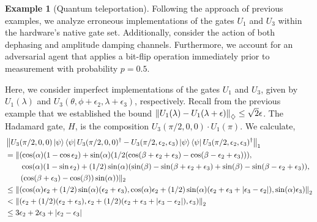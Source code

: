 \documentclass[10pt,a4paper]{amsart}
\theoremstyle{definition}
\theoremstyle{definition}
\newtheorem{example}[definition]{Example}
\theoremstyle{definition}
\theoremstyle{definition}
\theoremstyle{definition}
\theoremstyle{definition}
\begin{document}
  \begin{example}[Quantum teleportation]
    


    Following the approach of previous examples, we analyze erroneous implementations of the gates $U_1$ and $U_3$ within the hardware’s native gate set. Additionally, consider the action of both dephasing and amplitude damping channels. Furthermore, we account for an adversarial agent that applies a bit-flip operation immediately prior to measurement with probability $ p = 0.5 $.  

    Here, we consider imperfect implementations of the gates $U_1$ and $U_3$, given by $ U_1(\lambda) $ and $ U_3(\theta, \phi + \epsilon_2, \lambda + \epsilon_3)$, respectively. 
    Recall from the previous example that we established the bound $\left\lVert U_1(\lambda)- U_1(\lambda + \epsilon)  \right\rVert_{\diamondsuit} \leq \sqrt{2} \epsilon$.
     The Hadamard gate, $H$, is the composition $U_3(\pi/2, 0, 0)\cdot U_1(\pi)$. We calculate,
    \begin{align*}
      &\left\lVert U_3(\pi/2, 0, 0) \ket{\psi}\bra{\psi}U_3(\pi/2, 0, 0)^\dag - U_3(\pi/2, \epsilon_2, \epsilon_3)  \ket{\psi}\bra{\psi}U_3(\pi/2, \epsilon_2, \epsilon_3)^\dag \right\rVert_{1} \\
      & = \lVert (\cos(\alpha)( 1-\cos{\epsilon_2}) + \sin(\alpha)( 1/2(\cos(\beta + \epsilon_2 + \epsilon_3)-\cos(\beta - \epsilon_2 + \epsilon_3))), \\
      & \hspace{20pt} \cos(\alpha)( 1-\sin{\epsilon_2}) + (1/2)\sin(\alpha) (\sin(\beta)-\sin(\beta+\epsilon_2 + \epsilon_3) + \sin(\beta)-\sin(\beta-\epsilon_2 + \epsilon_3)),   \\
      & \hspace{20pt} (\cos(\beta + \epsilon_3)-\cos(\beta))\sin(\alpha) ) \lVert_2 \\
      & \leq \left\lVert (\cos(\alpha) \epsilon_2 + (1/2)\sin(\alpha) (\epsilon_2 + \epsilon_3) ,\cos(\alpha) \epsilon_2 + (1/2)  \sin(\alpha) (\epsilon_2 + \epsilon_3 + |\epsilon_3-\epsilon_2|), \sin(\alpha) \epsilon_3) \right\rVert_{2} \\
      &  < \left\lVert (\epsilon_2 + (1/2)(\epsilon_2 + \epsilon_3), \epsilon_2 + (1/2)   (\epsilon_2 + \epsilon_3 + |\epsilon_3-\epsilon_2|), \epsilon_3) \right\rVert_{2}  \\
      & \leq 3 \epsilon_2 +  2\epsilon_3 + |\epsilon_2-\epsilon_3| \\
    \end{align*}


\end{example}
\end{document}
